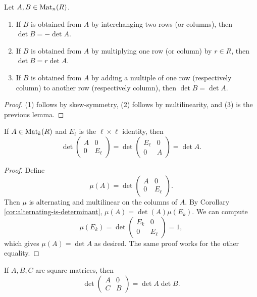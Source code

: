 \begin{prop}
  Let $A, B \in \operatorname{Mat}_n(R)$.
  \begin{enumerate}
    \item If $B$ is obtained from $A$ by interchanging
      two rows (or columns), then $\det B = -\det A$.
    \item If $B$ is obtained from $A$ by multiplying
      one row (or column) by $r \in R$, then
      $\det B = r \det A$.
    \item If $B$ is obtained from $A$ by adding a multiple
      of one row (respectively column) to another row
      (respectively column), then $\det B = \det A$.
  \end{enumerate}
\end{prop}

\begin{proof}
  (1) follows by skew-symmetry,
  (2) follows by multilinearity, and (3) is
  the previous lemma.
\end{proof}

\begin{lemma}
  If $A \in \operatorname{Mat}_k(R)$ and $E_\ell$ is the
  $\ell \times \ell$ identity, then
  \[
    \det
    \begin{pmatrix}
      A & 0 \\
      0 & E_\ell
    \end{pmatrix}
    =
    \det
    \begin{pmatrix}
      E_\ell & 0 \\
      0 & A
    \end{pmatrix}
    = \det A.
  \]
\end{lemma}

\begin{proof}
  Define
  \[
    \mu(A) = \det
    \begin{pmatrix}
      A & 0 \\
      0 & E_\ell
    \end{pmatrix}.
  \]
  Then $\mu$ is alternating and multilinear on the
  columns of $A$. By Corollary \ref{cor:alternating-is-determinant},
  $\mu(A) = \det(A) \mu(E_k)$. We can compute
  \[
    \mu(E_k) = \det
    \begin{pmatrix}
      E_k & 0 \\
      0 & E_\ell
    \end{pmatrix}
    = 1,
  \]
  which gives $\mu(A) = \det A$ as desired. The
  same proof works for the other equality.
\end{proof}

\begin{lemma}
  If $A, B, C$ are square matrices, then
  \[
    \det
    \begin{pmatrix}
      A & 0 \\
      C & B
    \end{pmatrix}
    = \det A \det B.
  \]
\end{lemma}

